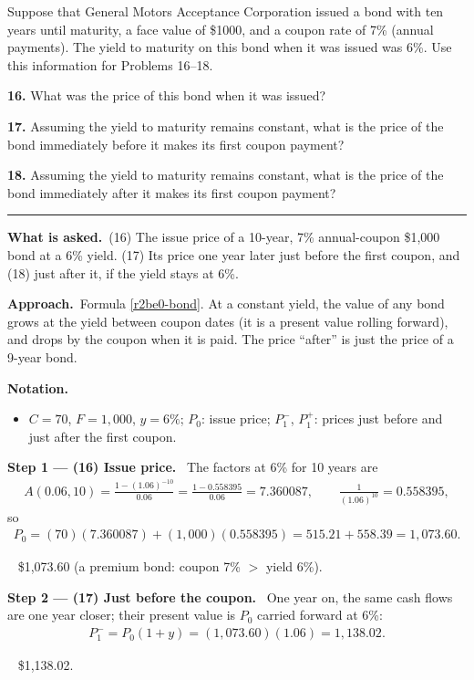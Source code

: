 \documentclass[11pt,a4paper]{article}
\newcommand{\notation}{\par\noindent\textbf{Notation.}}
\newcommand{\step}[2]{\par\medskip\noindent\textbf{Step #1 --- #2.}~}
\newcommand{\asked}{\par\medskip\noindent\textbf{What is asked.}~}
\newcommand{\approach}{\par\smallskip\noindent\textbf{Approach.}~}
\newcommand{\answer}[1]{\par\smallskip\noindent\fbox{\textbf{Answer #1.}}~}
\newcommand{\stmtend}{\par\endgroup\nopagebreak\noindent\rule{\linewidth}{0.4pt}\par\medskip}
\begin{document}
Suppose that General Motors Acceptance Corporation issued a bond with ten years until maturity, a
face value of \$1000, and a coupon rate of 7\% (annual payments). The yield to maturity on this bond
when it was issued was 6\%. Use this information for Problems 16--18.

\textbf{16.} What was the price of this bond when it was issued?

\textbf{17.} Assuming the yield to maturity remains constant, what is the price of the bond
immediately before it makes its first coupon payment?

\textbf{18.} Assuming the yield to maturity remains constant, what is the price of the bond
immediately after it makes its first coupon payment?
\stmtend

\asked (16) The issue price of a 10-year, 7\% annual-coupon \$1,000 bond at a 6\% yield. (17) Its price one year later just
before the first coupon, and (18) just after it, if the yield stays at 6\%.

\approach Formula \eqref{r2be0-bond}. At a constant yield, the value of any bond grows at the yield between coupon dates
(it is a present value rolling forward), and drops by the coupon when it is paid. The price ``after'' is just the price of
a 9-year bond.

\notation
\begin{itemize}
  \item $C=70$, $F=1{,}000$, $y=6\%$; $P_0$: issue price; $P_1^-$, $P_1^+$: prices just before and just after the first coupon.
\end{itemize}

\step{1}{(16) Issue price} The factors at 6\% for 10 years are
\begin{align}
  A(0.06,10) = \frac{1-(1.06)^{-10}}{0.06} = \frac{1-0.558395}{0.06} = 7.360087,\qquad \frac{1}{(1.06)^{10}} = 0.558395, \label{r2be7-f10}
\end{align}
so
\begin{align}
  P_0 = (70)(7.360087) + (1{,}000)(0.558395) = 515.21 + 558.39 = 1{,}073.60. \label{r2be7-P0}
\end{align}
\answer{(16)} \$1,073.60 (a premium bond: coupon 7\% $>$ yield 6\%).

\step{2}{(17) Just before the coupon} One year on, the same cash flows are one year closer; their present value is
$P_0$ carried forward at 6\%:
\begin{align}
  P_1^- = P_0(1+y) = (1{,}073.60)(1.06) = 1{,}138.02. \label{r2be7-Pm}
\end{align}
\answer{(17)} \$1,138.02.
\end{document}
